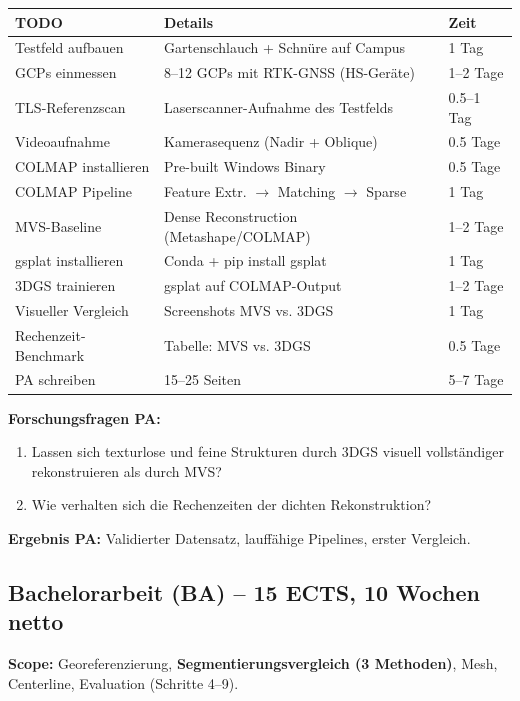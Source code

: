 \documentclass[11pt, a4paper]{article}
\begin{document}
\begin{center}
\small
\begin{tabular}{|p{3.5cm}|p{6.5cm}|p{2.5cm}|}
\hline
\textbf{TODO} & \textbf{Details} & \textbf{Zeit} \\
\hline
Testfeld aufbauen & Gartenschlauch + Schn\"ure auf Campus & 1 Tag \\
\hline
GCPs einmessen & 8--12 GCPs mit RTK-GNSS (HS-Ger\"ate) & 1--2 Tage \\
\hline
TLS-Referenzscan & Laserscanner-Aufnahme des Testfelds & 0.5--1 Tag \\
\hline
Videoaufnahme & Kamerasequenz (Nadir + Oblique) & 0.5 Tage \\
\hline
COLMAP installieren & Pre-built Windows Binary & 0.5 Tage \\
\hline
COLMAP Pipeline & Feature Extr. $\rightarrow$ Matching $\rightarrow$ Sparse & 1 Tag \\
\hline
MVS-Baseline & Dense Reconstruction (Metashape/COLMAP) & 1--2 Tage \\
\hline
gsplat installieren & Conda + pip install gsplat & 1 Tag \\
\hline
3DGS trainieren & gsplat auf COLMAP-Output & 1--2 Tage \\
\hline
Visueller Vergleich & Screenshots MVS vs. 3DGS & 1 Tag \\
\hline
Rechenzeit-Benchmark & Tabelle: MVS vs. 3DGS & 0.5 Tage \\
\hline
PA schreiben & 15--25 Seiten & 5--7 Tage \\
\hline
\end{tabular}
\end{center}

\textbf{Forschungsfragen PA:}
\begin{enumerate}[noitemsep]
    \item Lassen sich texturlose und feine Strukturen durch 3DGS visuell vollst\"andiger rekonstruieren als durch MVS?
    \item Wie verhalten sich die Rechenzeiten der dichten Rekonstruktion?
\end{enumerate}

\textbf{Ergebnis PA:} Validierter Datensatz, lauff\"ahige Pipelines, erster Vergleich.

\subsection{Bachelorarbeit (BA) -- 15 ECTS, 10 Wochen netto}
\textbf{Scope:} Georeferenzierung, \textbf{Segmentierungsvergleich (3 Methoden)}, Mesh, Centerline, Evaluation (Schritte 4--9).
\end{document}
